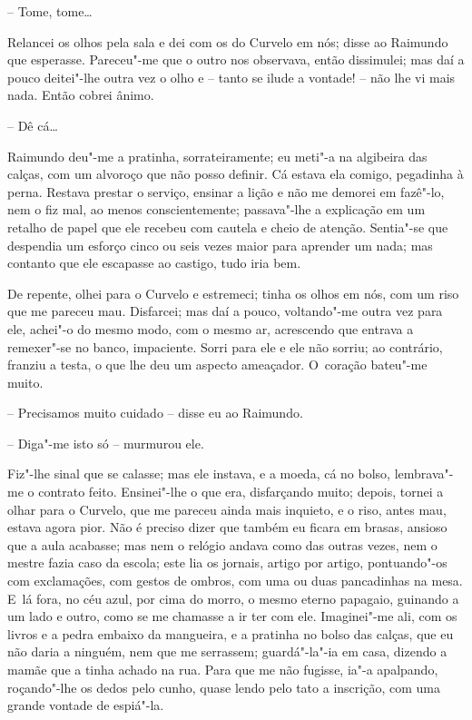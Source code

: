 -- Tome, tome\ldots{}

Relancei os olhos pela sala e dei com os do Curvelo em nós; disse ao
Raimundo que esperasse. Pareceu"-me que o outro nos observava, então
dissimulei; mas daí a pouco deitei"-lhe outra vez o olho e -- tanto se
ilude a vontade! -- não lhe vi mais nada. Então cobrei ânimo.

-- Dê cá\ldots{}

Raimundo deu"-me a pratinha, sorrateiramente; eu meti"-a na algibeira das
calças, com um alvoroço que não posso definir. Cá estava ela comigo,
pegadinha à perna. Restava prestar o serviço, ensinar a lição e não me
demorei em fazê"-lo, nem o fiz mal, ao menos conscientemente; passava"-lhe
a explicação em um retalho de papel que ele recebeu com cautela e cheio
de atenção. Sentia"-se que despendia um esforço cinco ou seis vezes maior
para aprender um nada; mas contanto que ele escapasse ao castigo, tudo
iria bem.

De repente, olhei para o Curvelo e estremeci; tinha os olhos em nós, com
um riso que me pareceu mau. Disfarcei; mas daí a pouco, voltando"-me
outra vez para ele, achei"-o do mesmo modo, com o mesmo ar, acrescendo
que entrava a remexer"-se no banco, impaciente. Sorri para ele e ele não
sorriu; ao contrário, franziu a testa, o que lhe deu um aspecto
ameaçador. O~coração bateu"-me muito.

-- Precisamos muito cuidado -- disse eu ao Raimundo.

-- Diga"-me isto só -- murmurou ele.

Fiz"-lhe sinal que se calasse; mas ele instava, e a moeda, cá no bolso,
lembrava"-me o contrato feito. Ensinei"-lhe o que era, disfarçando muito;
depois, tornei a olhar para o Curvelo, que me pareceu ainda mais
inquieto, e o riso, antes mau, estava agora pior. Não é preciso dizer
que também eu ficara em brasas, ansioso que a aula acabasse; mas nem o
relógio andava como das outras vezes, nem o mestre fazia caso da escola;
este lia os jornais, artigo por artigo, pontuando"-os com exclamações,
com gestos de ombros, com uma ou duas pancadinhas na mesa. E~lá fora, no
céu azul, por cima do morro, o mesmo eterno papagaio, guinando a um lado
e outro, como se me chamasse a ir ter com ele. Imaginei"-me ali, com os
livros e a pedra embaixo da mangueira, e a pratinha no bolso das calças,
que eu não daria a ninguém, nem que me serrassem; guardá"-la"-ia em casa,
dizendo a mamãe que a tinha achado na rua. Para que me não fugisse, ia"-a
apalpando, roçando"-lhe os dedos pelo cunho, quase lendo pelo tato a
inscrição, com uma grande vontade de espiá"-la.

